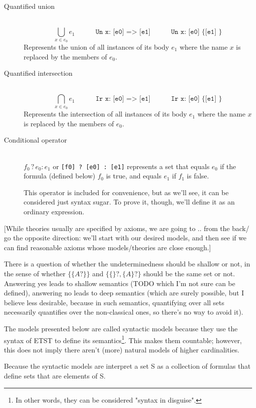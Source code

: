 \documentclass[oneside,12pt]{book}
\newcounter{question}
\theoremstyle{definition}
\theoremstyle{remark}
\newcommand{\conditional}[3]{#1 \mathrel{?} #2 : #3}
\begin{document}
\begin{description}
  \item[Quantified union] \hfill \\
    \[\bigcup_{x \in e_0}e_1\quad\quad\quad\texttt{Un x: [e0] => [e1]}
    \quad\quad\quad\texttt{Un x: [e0] \{ [e1] \}}\]
    Represents the union of all instances of its body $e_1$ where the name
    $x$ is replaced by the members of $e_0$.
  \item[Quantified intersection] \hfill \\
    \[\bigcap_{x \in e_0}e_1\quad\quad\quad\texttt{Ir x: [e0] => [e1]}
    \quad\quad\quad\texttt{Ir x: [e0] \{ [e1] \}}\]
    Represents the intersection of all instances of its body $e_1$ where the name
    $x$ is replaced by the members of $e_0$.
    
  \item[Conditional operator] \hfill \\
    $\conditional{f_0}{e_0}{e_1}$ or \texttt{[f0] ? [e0] : [e1]} represents a set
    that equals $e_0$ if the formula (defined below) $f_0$ is true, and equals
    $e_1$ if $f_1$ is false.
    
    This operator is included for convenience, but as we'll see, it can be considered
    just syntax sugar. To prove it, though, we'll define it as an ordinary expression.
\end{description}

[While theories usually are specified by axioms, we are going to .. from the back/
go the opposite direction: we'll start with our desired models, and then see
if we can find reasonable axioms whose models/theories are close enough.]

There is a question of whether the undeterminedness should be shallow or not,
in the sense of whether $\{ \{ A? \} \}$ and $\{ \{\}?, \{ A \}? \}$ should be
the same set or not. Answering yes leads to shallow semantics (TODO which I'm not
sure can be defined), answering no leads to deep semantics (which are surely possible,
but I believe less desirable, because in such semantics, quantifying over all sets
necessarily quantifies over the non-classical ones, so there's no way to avoid it).

The models presented below are called syntactic models because they use the syntax
of ETST to define its semantics\footnote{In other words, they can be considered
"syntax in disguise".}. This makes them countable; however, this does not imply
there aren't (more) natural models of higher cardinalities.

Because the syntactic models are
interpret a set S as a collection of formulas that define sets that are elements of S.
\end{document}
